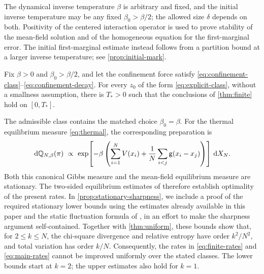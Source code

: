 \documentclass[11pt,reqno]{amsart}
\numberwithin{equation}{section}
\theoremstyle{plain}
\theoremstyle{remark}
\begin{document}
The dynamical inverse temperature $\beta$ is arbitrary and fixed, and the initial inverse temperature may be any fixed $\beta_0>\beta/2$; the allowed size $\delta$ depends on both. Positivity of the centered interaction operator is used to prove stability of the mean-field solution and of the homogeneous equation for the first-marginal error. The initial first-marginal estimate instead follows from a partition bound at a larger inverse temperature; see \cref{prop:initial-mark}.



\begin{cor}\label{cor:local}
Fix $\beta>0$ and $\beta_0>\beta/2$, and let the confinement force satisfy \eqref{eq:confinement-class}--\eqref{eq:confinement-decay}. For every $z_0$ of the form \eqref{eq:explicit-class}, without a smallness assumption, there is $T_*>0$ such that the conclusions of \cref{thm:finite} hold on $[0,T_*]$.
\end{cor}



\begin{remark}\label{rem:intro-sharpness}
The admissible class contains the matched choice $\beta_0=\beta$. For the thermal equilibrium measure \eqref{eq:thermal}, the corresponding preparation is
\begin{equation}\label{eq:stationary-preparation}
 \,\mathrm d\mathbb Q_{N,\beta}(\pi)\ \propto\
 \exp\!\left[-\beta\left(\sum_{i=1}^NV(x_i)+\frac1N\sum_{i<j}\mathsf g(x_i-x_j)\right)\right]\,\mathrm d X_N.
\end{equation}
Both this canonical Gibbs measure and the mean-field equilibrium measure are stationary. The two-sided equilibrium estimates of \cite[Theorem~2.1]{DGRchaos} therefore establish optimality of the present rates. In \cref{prop:stationary-sharpness}, we include a proof of the required stationary lower bounds using the estimates already available in this paper and the static fluctuation formula of \cite{DGRpartition}, in an effort to make the sharpness argument self-contained. Together with \cref{thm:uniform}, these bounds show that, for $2\le k\le N$, the chi-square divergence and relative entropy have order $k^2/N^2$, and total variation has order $k/N$. Consequently, the rates in \eqref{eq:finite-rates} and \eqref{eq:main-rates} cannot be improved uniformly over the stated classes. The lower bounds start at $k=2$; the upper estimates also hold for $k=1$.



\end{remark}
\end{document}
